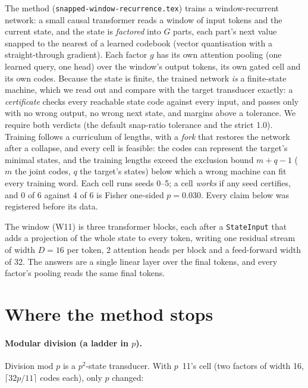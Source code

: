 \documentclass[11pt]{article}
\begin{document}
The method (\texttt{snapped-window-recurrence.tex}) trains a window-recurrent network: a small
causal transformer reads a window of input tokens and the current state, and the state is
\emph{factored} into $G$ parts, each part's next value snapped to the nearest of a learned
codebook (vector quantisation with a straight-through gradient). Each factor $g$ has its own
attention pooling (one learned query, one head) over the window's output tokens, its own gated
cell and its own codes. Because the state is finite, the trained network \emph{is} a finite-state
machine, which we read out and compare with the target transducer exactly: a \emph{certificate}
checks every reachable state code against every input, and passes only with no wrong output, no
wrong next state, and margins above a tolerance. We require both verdicts (the default snap-ratio
tolerance and the strict 1.0). Training follows a curriculum of lengths, with a \emph{fork} that
restores the network after a collapse, and every cell is feasible: the codes can represent the
target's minimal states, and the training lengths exceed the exclusion bound $m + q - 1$ ($m$ the
joint codes, $q$ the target's states) below which a wrong machine can fit every training word.
Each cell runs seeds 0--5; a cell \emph{works} if any seed certifies, and 0 of 6 against 4 of 6
is Fisher one-sided $p = 0.030$. Every claim below was registered before its data.

The window (W11) is three transformer blocks, each after a \texttt{StateInput} that adds a
projection of the whole state to every token, writing one residual stream of width $D = 16$ per
token, 2 attention heads per block and a feed-forward width of 32. The answers are a single linear
layer over the final tokens, and every factor's pooling reads the same final tokens.

\section{Where the method stops}
\label{sec:limits}

\paragraph{Modular division (a ladder in $p$).} Division mod $p$ is a $p^2$-state transducer.
With $p$~11's cell (two factors of width 16, $\lceil 32p/11 \rceil$ codes each), only $p$ changed:
\end{document}
